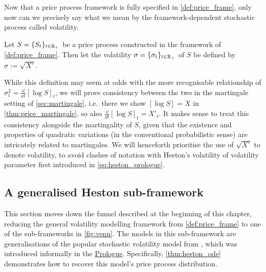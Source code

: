 Now that a price process framework is fully specified in \autoref{def:price_frame}, only now can we precisely say what we mean by the framework-dependent stochastic process called volatility.
\begin{definition}[Volatility]\label{def:volatility}
    Let $S=\{S_t\}_{t\in\mathbb{R}_+}$ be a price process constructed in the framework of \autoref{def:price_frame}. Then let the volatility $\sigma=\{\sigma_t\}_{t\in\mathbb{R}_+}$ of $S$ be defined by $\sigma := \sqrt{X'}$.
\end{definition}

While this definition may seem at odds with the more recognisable relationship of $\sigma^2_t = \frac{\dd}{\dd t}[\log S]_t$, we will prove consistency between the two in the martingale setting of \autoref{sec:martingale}, i.e.~there we show $[\log S] = X$ in \autoref{thm:price_martingale}, so also $\frac{\dd}{\dd t}[\log S]_t = X'_t$. It makes sense to treat this consistency alongside the martingality of $S$, given that the existence and properties of quadratic variations (in the conventional probabilistic sense) are intricately related to martingales. We will henceforth prioritise the use of $\sqrt{X'}$ to denote volatility, to avoid clashes of notation with Heston's volatility of volatility parameter first introduced in \autoref{eq:heston_prologue}.

\subsection{A generalised Heston sub-framework}\label{sec:heston_frame}

This section moves down the funnel described at the beginning of this chapter, reducing the general volatility modelling framework from \autoref{def:price_frame} to one of the sub-frameworks in \autoref{fig:venn}. The models in this sub-framework are generalisations of the popular stochastic volatility model from \cite{heston_1993}, which was introduced informally in the \hyperlink{prologue}{Prologue}. Specifically, \autoref{thm:heston_ode} demonstrates how to recover this model's price process distribution.

